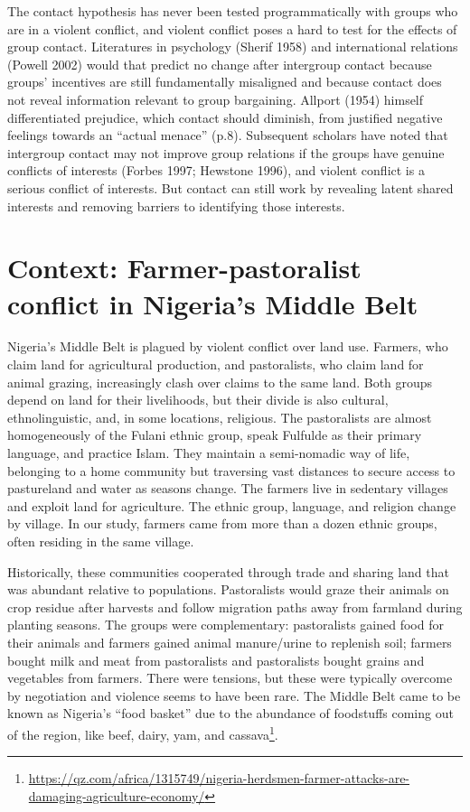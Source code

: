 \documentclass[11pt]{article}
\begin{document}
The contact hypothesis has never been tested programmatically with
groups who are in a violent conflict, and violent conflict poses a hard
to test for the effects of group contact. Literatures in psychology
(Sherif 1958) and international relations (Powell 2002) would that
predict no change after intergroup contact because groups' incentives
are still fundamentally misaligned and because contact does not reveal
information relevant to group bargaining. Allport (1954) himself
differentiated prejudice, which contact should diminish, from justified
negative feelings towards an ``actual menace'' (p.8). Subsequent
scholars have noted that intergroup contact may not improve group
relations if the groups have genuine conflicts of interests (Forbes
1997; Hewstone 1996), and violent conflict is a serious conflict of
interests. But contact can still work by revealing latent shared
interests and removing barriers to identifying those interests.

\hypertarget{context-farmer-pastoralist-conflict-in-nigerias-middle-belt}{%
\section{Context: Farmer-pastoralist conflict in Nigeria's Middle
Belt}\label{context-farmer-pastoralist-conflict-in-nigerias-middle-belt}}

Nigeria's Middle Belt is plagued by violent conflict over land use.
Farmers, who claim land for agricultural production, and pastoralists,
who claim land for animal grazing, increasingly clash over claims to the
same land. Both groups depend on land for their livelihoods, but their
divide is also cultural, ethnolinguistic, and, in some locations,
religious. The pastoralists are almost homogeneously of the Fulani
ethnic group, speak Fulfulde as their primary language, and practice
Islam. They maintain a semi-nomadic way of life, belonging to a home
community but traversing vast distances to secure access to pastureland
and water as seasons change. The farmers live in sedentary villages and
exploit land for agriculture. The ethnic group, language, and religion
change by village. In our study, farmers came from more than a dozen
ethnic groups, often residing in the same village.

Historically, these communities cooperated through trade and sharing
land that was abundant relative to populations. Pastoralists would graze
their animals on crop residue after harvests and follow migration paths
away from farmland during planting seasons. The groups were
complementary: pastoralists gained food for their animals and farmers
gained animal manure/urine to replenish soil; farmers bought milk and
meat from pastoralists and pastoralists bought grains and vegetables
from farmers. There were tensions, but these were typically overcome by
negotiation and violence seems to have been rare. The Middle Belt came
to be known as Nigeria's ``food basket'' due to the abundance of
foodstuffs coming out of the region, like beef, dairy, yam, and
cassava\footnote{\url{https://qz.com/africa/1315749/nigeria-herdsmen-farmer-attacks-are-damaging-agriculture-economy/}}.
\end{document}
